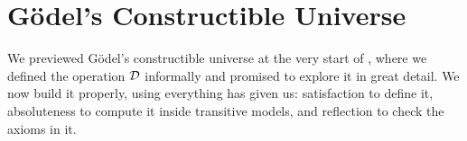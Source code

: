 \chapter{Gödel's Constructible Universe} \label{Ch4:CH}
\thispagestyle{empty}

We previewed Gödel's constructible universe at the very start of , where we defined the operation $\mathcal{D}$ informally and promised to explore it in great detail. We now build it properly, using everything  has given us: satisfaction to define it, absoluteness to compute it inside transitive models, and reflection to check the axioms in it.







